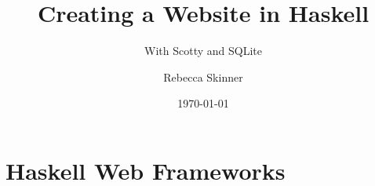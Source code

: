 \documentclass{beamer}
\title{Creating a Website in Haskell}
\subtitle{ \small{With Scotty and SQLite}}
\author{Rebecca Skinner}
\institute{Haskell User Group St. Louis}
\date{\today}
\begin{document}
\begin{frame}
  \titlepage{}
\end{frame}

\section{Haskell Web Frameworks}
\end{document}
